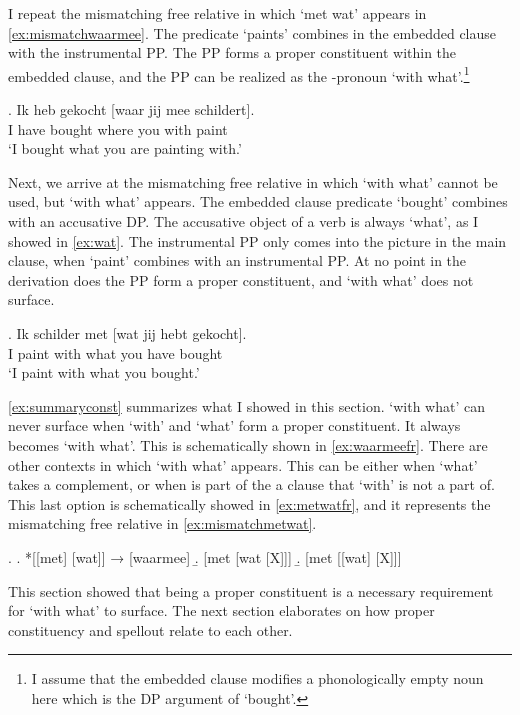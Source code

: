 \documentclass{article}
\begin{document}
I repeat the mismatching free relative in which  `met wat' appears in \ref{ex:mismatchwaarmee}. The predicate  `paints' combines in the embedded clause with the instrumental PP. The PP forms a proper constituent within the embedded clause, and the PP can be realized as the -pronoun  `with what'.\footnote{I assume that the embedded clause modifies a phonologically empty noun here which is the DP argument of  `bought'.}

\exg. Ik heb gekocht [waar jij mee schildert].\\
 I have bought where you with paint\\
 `I bought what you are painting with.'\label{ex:mismatchwaarmee}

Next, we arrive at the mismatching free relative in which  `with what' cannot be used, but  `with what' appears. The embedded clause predicate  `bought' combines with an accusative DP. The accusative object of a verb is always  `what', as I showed in \ref{ex:wat}. The instrumental PP only comes into the picture in the main clause, when  `paint' combines with an instrumental PP. At no point in the derivation does the PP form a proper constituent, and  `with what' does not surface.

\exg. Ik schilder met [wat jij hebt gekocht].\\
 I paint with what you have bought\\
 `I paint with what you bought.'\label{ex:mismatchmetwat}

\ref{ex:summaryconst} summarizes what I showed in this section.  `with what' can never surface when  `with' and  `what' form a proper constituent. It always becomes  `with what'. This is schematically shown in \ref{ex:waarmeefr}.
There are other contexts in which  `with what' appears. This can be either when  `what' takes a complement, or when  is part of the a clause that  `with' is not a part of. This last option is schematically showed in \ref{ex:metwatfr}, and it represents the mismatching free relative in \ref{ex:mismatchmetwat}.

\ex.\label{ex:summaryconst}
\a. *[[met] [wat]] → [waarmee]\label{ex:waarmeefr}
\b. [met [wat [X]]]
\b. [met [[wat] [X]]]\label{ex:metwatfr}

This section showed that being a proper constituent is a necessary requirement for  `with what' to surface. The next section elaborates on how proper constituency and spellout relate to each other.
\end{document}
